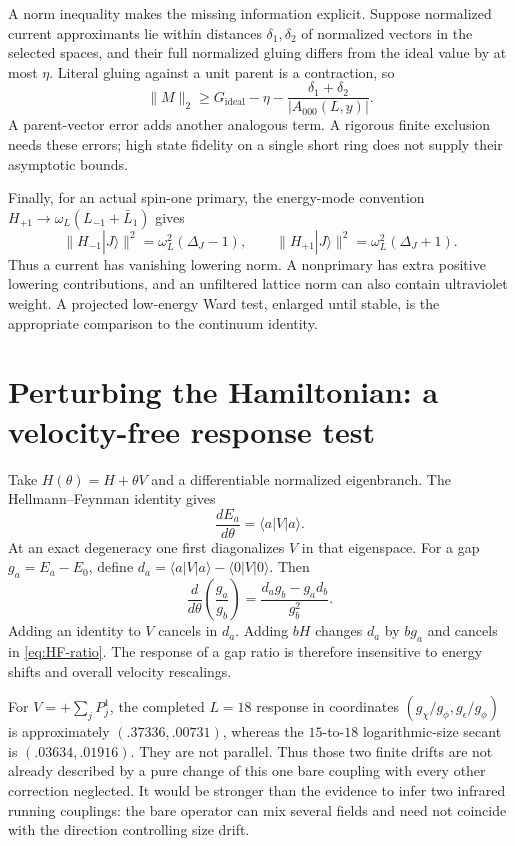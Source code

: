 A norm inequality makes the missing information explicit. Suppose
normalized current approximants lie within distances
$\delta_1,\delta_2$ of normalized vectors in the selected spaces,
and their full normalized gluing differs from the ideal value by
at most $\eta$. Literal gluing against a unit parent is a
contraction, so
\[
 \|M\|_2\geq G_{\mathrm{ideal}}-\eta
 -\frac{\delta_1+\delta_2}{|A_{000}(L,y)|}.
\]
A parent-vector error adds another analogous term. A rigorous
finite exclusion needs these errors; high state fidelity on a
single short ring does not supply their asymptotic bounds.

Finally, for an actual spin-one primary, the energy-mode convention
$H_{+1}\to\omega_L(L_{-1}+\bar L_1)$ gives
\[
 \|H_{-1}|J\rangle\|^2=\omega_L^2(\Delta_J-1),\qquad
 \|H_{+1}|J\rangle\|^2=\omega_L^2(\Delta_J+1).
\]
Thus a current has vanishing lowering norm. A nonprimary has extra
positive lowering contributions, and an unfiltered lattice norm
can also contain ultraviolet weight. A projected low-energy Ward
test, enlarged until stable, is the appropriate comparison to the
continuum identity.

\section{Perturbing the Hamiltonian: a velocity-free response test}

Take $H(\theta)=H+\theta V$ and a differentiable normalized eigenbranch.
The Hellmann--Feynman identity gives
\[
 \frac{dE_a}{d\theta}=\langle a|V|a\rangle.
\]
At an exact degeneracy one first diagonalizes $V$ in that eigenspace.
For a gap $g_a=E_a-E_0$, define
$d_a=\langle a|V|a\rangle-\langle0|V|0\rangle$. Then
\begin{equation}
 \frac{d}{d\theta}\left(\frac{g_a}{g_b}\right)
 =\frac{d_ag_b-g_ad_b}{g_b^2}.
 \label{eq:HF-ratio}
\end{equation}
Adding an identity to $V$ cancels in $d_a$. Adding $bH$ changes
$d_a$ by $bg_a$ and cancels in \eqref{eq:HF-ratio}. The response of a
gap ratio is therefore insensitive to energy shifts and overall
velocity rescalings.

For $V=+\sum_jP_j^1$, the completed $L=18$ response in coordinates
$(g_\chi/g_\phi,g_\epsilon/g_\phi)$ is approximately
$(.37336,.00731)$, whereas the $15$-to-$18$ logarithmic-size secant
is $(.03634,.01916)$. They are not parallel. Thus those two finite
drifts are not already described by a pure change of this one bare
coupling with every other correction neglected. It would be stronger
than the evidence to infer two infrared running couplings: the bare
operator can mix several fields and need not coincide with the
direction controlling size drift.


